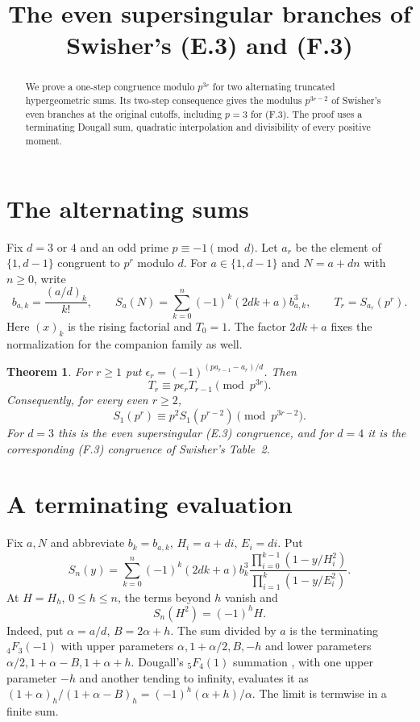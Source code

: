 \documentclass[11pt]{article}
\title{\bfseries The even supersingular branches of\\Swisher's (E.3) and (F.3)}
\author{}\date{}
\newtheorem{theorem}{Theorem}
\begin{document}
\maketitle\vspace{-3em}
\begin{abstract}
We prove a one-step congruence modulo $p^{3r}$ for two alternating
truncated hypergeometric sums. Its two-step consequence gives the
modulus $p^{3r-2}$ of Swisher's even branches at the original cutoffs,
including $p=3$ for (F.3). The proof uses a terminating Dougall sum,
quadratic interpolation and divisibility of every positive moment.
\end{abstract}
\section{The alternating sums}
Fix $d=3$ or $4$ and an odd prime $p\equiv-1\pmod d$. Let $a_r$ be
the element of $\{1,d-1\}$ congruent to $p^r$ modulo $d$.
For $a\in\{1,d-1\}$ and $N=a+dn$ with $n\ge0$, write
\[
 b_{a,k}=\frac{(a/d)_k}{k!},\qquad
 S_a(N)=\sum_{k=0}^n(-1)^k(2dk+a)b_{a,k}^3,\qquad
 T_r=S_{a_r}(p^r).
\]
Here $(x)_k$ is the rising factorial and $T_0=1$. The factor $2dk+a$
fixes the normalization for the companion family as well.
\begin{theorem}\label{thm}
For $r\ge1$ put $\epsilon_r=(-1)^{(p a_{r-1}-a_r)/d}$. Then
\[
 T_r\equiv p\epsilon_r T_{r-1}\pmod{p^{3r}}.
\]
Consequently, for every even $r\ge2$,
\[
 \boxed{S_1(p^r)\equiv p^2 S_1(p^{r-2})\pmod{p^{3r-2}}.}
\]
For $d=3$ this is the even supersingular (E.3) congruence, and for
$d=4$ it is the corresponding (F.3) congruence of Swisher's Table~2.
\end{theorem}
\section{A terminating evaluation}
Fix $a,N$ and abbreviate $b_k=b_{a,k}$, $H_i=a+di$, $E_i=di$. Put
\[
 S_n(y)=\sum_{k=0}^n(-1)^k(2dk+a)b_k^3
 \frac{\prod_{i=0}^{k-1}(1-y/H_i^2)}{\prod_{i=1}^k(1-y/E_i^2)}.
\]
At $H=H_h$, $0\le h\le n$, the terms beyond $h$ vanish and
\begin{equation}\label{node}
 S_n(H^2)=(-1)^hH.
\end{equation}
Indeed, put $\alpha=a/d$, $B=2\alpha+h$. The sum divided by $a$ is
the terminating \({}_4F_3(-1)\) with upper parameters
$\alpha,1+\alpha/2,B,-h$ and lower parameters
$\alpha/2,1+\alpha-B,1+\alpha+h$. Dougall's \({}_5F_4(1)\)
summation \cite{dlmf}, with one upper parameter $-h$ and another
tending to infinity, evaluates it as
$(1+\alpha)_h/(1+\alpha-B)_h=(-1)^h(\alpha+h)/\alpha$.
The limit is termwise in a finite sum.
\end{document}
